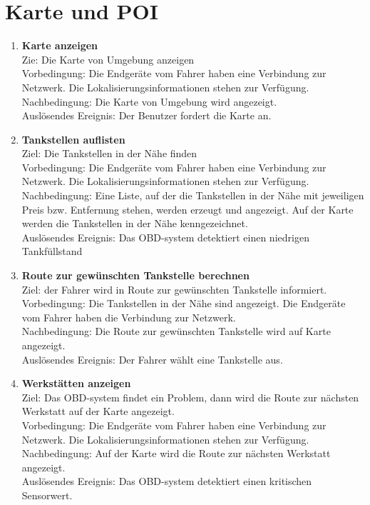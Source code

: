 \documentclass[pflichtenheft.tex]{subfiles}
\begin{document}
	
	\section{\textbf{Karte und POI}}
	
	\begin{enumerate}
	\setcounter{enumi}{\value{enumTemp}}
	\item{\textbf{Karte anzeigen}}
		\\Zie: Die Karte von Umgebung anzeigen
		\\Vorbedingung: Die Endgeräte vom Fahrer haben eine Verbindung zur Netzwerk.
		Die Lokalisierungsinformationen stehen zur Verfügung.
		\\Nachbedingung: Die Karte von Umgebung wird angezeigt.
  	 	\\Auslösendes Ereignis: Der Benutzer fordert die Karte an.
  	\item {\textbf{Tankstellen auflisten}}
		\\Ziel: Die Tankstellen in der Nähe finden
		\\Vorbedingung: Die Endgeräte vom Fahrer haben eine Verbindung zur Netzwerk.
		Die Lokalisierungsinformationen stehen zur Verfügung.
		\\Nachbedingung: Eine Liste, auf der die Tankstellen in der Nähe mit
		jeweiligen Preis bzw. Entfernung stehen, werden erzeugt und angezeigt. Auf der
		Karte werden die Tankstellen in der Nähe kenngezeichnet.
		\\Auslösendes Ereignis: Das OBD-system detektiert einen niedrigen
		Tankfüllstand
  	
  	\item {\textbf{Route zur gewünschten Tankstelle berechnen}}
  		\\Ziel: der Fahrer wird in Route zur gewünschten Tankstelle informiert. 
  		\\Vorbedingung: Die Tankstellen in der Nähe sind angezeigt. Die Endgeräte
  		vom Fahrer haben die Verbindung zur Netzwerk.
  		\\Nachbedingung: Die Route zur gewünschten Tankstelle wird auf Karte
  		angezeigt.
   		\\Auslösendes Ereignis: Der Fahrer wählt eine Tankstelle aus.
  
	\item{\textbf{Werkstätten anzeigen}} 
		\\Ziel: Das OBD-system findet ein Problem, dann wird die Route zur nächsten
		Werkstatt auf der Karte angezeigt.
		\\Vorbedingung: Die Endgeräte vom Fahrer haben eine Verbindung zur Netzwerk.
		Die Lokalisierungsinformationen stehen zur Verfügung.
		\\Nachbedingung: Auf der Karte wird die Route zur nächsten Werkstatt
		angezeigt.
	 	\\Auslösendes Ereignis: Das OBD-system detektiert einen kritischen Sensorwert.

	\setcounter{enumTemp}{\value{enumi}}
	\end{enumerate}
\end{document}
